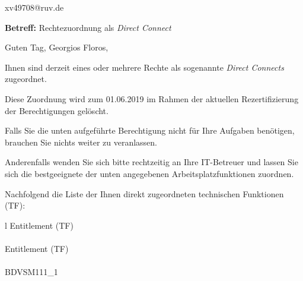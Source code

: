 \documentclass[a4paper,landscape,12pt]{letter}
\begin{document}
\begin{letter}{xv49708@ruv.de\hfill \break}
\begin{normalsize}
	\opening{\textbf{Betreff:} Rechtezuordnung als \emph{Direct Connect}}
	\begin{normalsize} \hfill
	\end{normalsize}

	\begin{normalsize}
		Guten Tag, 
	Georgios Floros, \hfill \break
	\end{normalsize}
	\end{normalsize}
	
\begin{normalsize}
	Ihnen sind derzeit eines oder mehrere Rechte als sogenannte \emph{Direct Connects} zugeordnet.
	
	Diese Zuordnung wird zum 01.06.2019 im Rahmen der aktuellen Rezertifizierung der Berechtigungen gelöscht.
	
	Falls Sie die unten aufgeführte Berechtigung nicht für Ihre Aufgaben benötigen, 
	brauchen Sie nichts weiter zu veranlassen.
	
	Anderenfalls wenden Sie sich bitte rechtzeitig an Ihre IT-Betreuer 
	und lassen Sie sich die bestgeeignete der unten angegebenen Arbeitsplatzfunktionen zuordnen.
	\end{normalsize}
	
\begin{normalsize}
	Nachfolgend die Liste der Ihnen direkt zugeordneten technischen Funktionen (TF):

	\begin{longtable}{l}
		Entitlement (TF) \\ \hline
		\endfirsthead
		\\\hline
		Entitlement (TF) \\ \hline
		\endhead %
		\multicolumn{1}{r@{}}{Fortsetzung \ldots}\\
		\endfoot
		\hline
		\endlastfoot
	BDVSM111\_1\\
	\end{longtable}
	\end{normalsize}
	

\end{letter}
\end{document}
